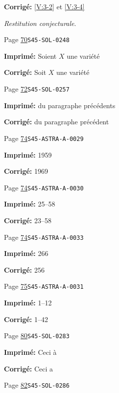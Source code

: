 \begin{description}
\par\noindent\textbf{Corrigé:} \ref{V:3-2} et \ref{V:3-4}
\par\noindent\emph{Restitution conjecturale}.
\smallskip
\item[\hypertarget{apparatus:FR-0030}{30}] Page \hyperlink{printpage:fr:70}{70}\quad\texttt{S45-SOL-0248}
\par\noindent\textbf{Imprimé:} Soient $X$ une variété
\par\noindent\textbf{Corrigé:} Soit $X$ une variété
\smallskip
\item[\hypertarget{apparatus:FR-0031}{31}] Page \hyperlink{printpage:fr:72}{72}\quad\texttt{S45-SOL-0257}
\par\noindent\textbf{Imprimé:} du paragraphe précédents
\par\noindent\textbf{Corrigé:} du paragraphe précédent
\smallskip
\item[\hypertarget{apparatus:FR-0032}{32}] Page \hyperlink{printpage:fr:74}{74}\quad\texttt{S45-ASTRA-A-0029}
\par\noindent\textbf{Imprimé:} 1959
\par\noindent\textbf{Corrigé:} 1969
\smallskip
\item[\hypertarget{apparatus:FR-0033}{33}] Page \hyperlink{printpage:fr:74}{74}\quad\texttt{S45-ASTRA-A-0030}
\par\noindent\textbf{Imprimé:} 25--58
\par\noindent\textbf{Corrigé:} 23--58
\smallskip
\item[\hypertarget{apparatus:FR-0034}{34}] Page \hyperlink{printpage:fr:74}{74}\quad\texttt{S45-ASTRA-A-0033}
\par\noindent\textbf{Imprimé:} 266
\par\noindent\textbf{Corrigé:} 256
\smallskip
\item[\hypertarget{apparatus:FR-0035}{35}] Page \hyperlink{printpage:fr:75}{75}\quad\texttt{S45-ASTRA-A-0031}
\par\noindent\textbf{Imprimé:} 1--12
\par\noindent\textbf{Corrigé:} 1--42
\smallskip
\item[\hypertarget{apparatus:FR-0036}{36}] Page \hyperlink{printpage:fr:80}{80}\quad\texttt{S45-SOL-0283}
\par\noindent\textbf{Imprimé:} Ceci à
\par\noindent\textbf{Corrigé:} Ceci a
\smallskip
\item[\hypertarget{apparatus:FR-0037}{37}] Page \hyperlink{printpage:fr:82}{82}\quad\texttt{S45-SOL-0286}

\end{description}
